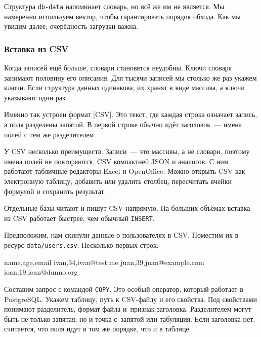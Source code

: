 \fi

Структура \verb|db-data| напоминает словарь, но всё же им не является. Мы
намеренно используем вектор, чтобы гарантировать порядок обхода. Как мы увидим
далее, очерёдность загрузки важна.

\subsubsection*{Вставка из CSV}


Когда записей ещё больше, словари становятся неудобны. Ключи словаря занимают
половину его описания. Для тысячи записей мы столько же раз укажем ключи. Если
структура данных одинакова, их хранят в виде массива, а ключи указывают один
раз.

Именно так устроен формат [CSV].
Это текст, где каждая строка означает запись, а поля разделены запятой.
В первой строке обычно идёт заголовок~--- имена полей с тем же разделителем.

У CSV несколько преимуществ. Записи~--- это массивы, а не словари, поэтому имена
полей не повторяются. CSV компактней JSON и аналогов. С ним работают табличные
редакторы Excel и OpenOffice. Можно открыть CSV как электронную таблицу,
добавить или удалить столбец, пересчитать ячейки формулой и сохранить результат.


Отдельные базы читают и пишут CSV напрямую. На больших объёмах вставка из CSV
работает быстрее, чем обычный \verb|INSERT|.

Предположим, нам скинули данные о пользователях в CSV. Поместим их в ресурс
\verb|data/users.csv|. Несколько первых строк:

\begin{english}
  \begin{text}
name,age,email
ivan,34,ivan@test.me
juan,39,juan@example.com
ioan,19,ioan@dunno.org
  \end{text}
\end{english}


Составим запрос с командой \verb|COPY|. Это особый оператор, который работает в
PostgreSQL. Укажем таблицу, путь к CSV-файлу и его свойства. Под свойствами
понимают разделитель, формат файла и~признак заголовка. Разделителем могут быть
не только запятая, но и точка с~запятой или табуляция. Если заголовка нет,
считается, что поля идут в том же порядке, что и в таблице.

